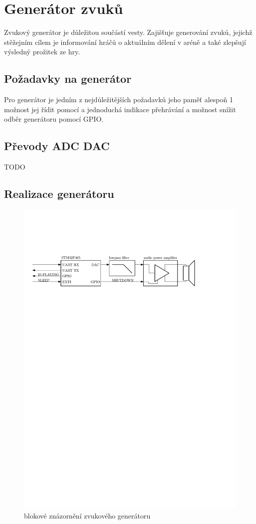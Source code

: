 \chapter{Generátor zvuků}
Zvukový generátor je důležitou součástí  vesty. Zajišťuje generování zvuků, jejichž stěžejním cílem je informování hráčů o aktuálním dělení v aréně a také zlepšují výsledný prožitek ze hry.

\section{Požadavky na generátor}
Pro generátor je jedním z nejdůležitějších požadavků jeho paměť alespoň 1~ možnost jej řídit pomocí  a jednoduchá indikace přehrávání a možnost snížit odběr generátoru pomocí GPIO.

\section{Převody ADC DAC}
TODO


\section{Realizace generátoru}
\begin{figure}[H]
    \begin{center}
        \includegraphics[width=\textwidth]{img/sound-system}
    \end{center}
    \caption{blokové znázornění zvukového generátoru}
\end{figure}

